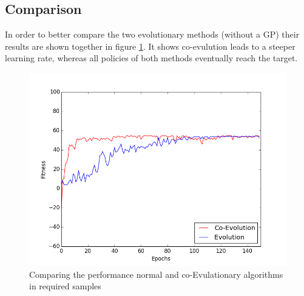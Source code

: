 \subsection{Comparison}
In order to better compare the two evolutionary methods (without a GP) their results are shown together in figure \ref{compare_img}. It shows co-evulution leads to a steeper learning rate, whereas all policies of both methods eventually reach the target.

\begin{figure}[ht]
  \centering
  \includegraphics[scale=0.5]{images/together.png}
  \caption{Comparing the performance normal and co-Evulationary algorithms in required samples}\label{compare_img}
\end{figure}


